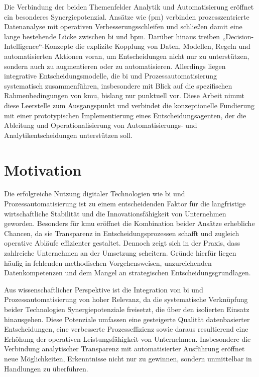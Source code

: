 Die Verbindung der beiden Themenfelder Analytik und Automatisierung eröffnet ein besonderes Synergiepotenzial. \cite{Jäger:2023} Ansätze wie  (\gls{pm}) verbinden prozesszentrierte Datenanalyse mit operativen Verbesserungsschleifen und schließen damit eine lange bestehende Lücke zwischen \gls{bi} und \gls{bpm}. \cite{vanDerAalst:2016} Darüber hinaus treiben „Decision-Intelligence“-Konzepte die explizite Kopplung von Daten, Modellen, Regeln und automatisierten Aktionen voran, um Entscheidungen nicht nur zu unterstützen, sondern auch zu augmentieren oder zu automatisieren. \cite{BrethenouxEtAl:2024} Allerdings liegen integrative Entscheidungsmodelle, die \gls{bi} und Prozessautomatisierung systematisch zusammenführen, insbesondere mit Blick auf die spezifischen Rahmenbedingungen von \gls{kmu}, bislang nur punktuell vor. \cite{NajahElGharibAmyot:2023,SamuelFossoWambaMishra:2017} Diese Arbeit nimmt diese Leerstelle zum Ausgangspunkt und verbindet die konzeptionelle Fundierung mit einer prototypischen Implementierung eines Entscheidungsagenten, der die Ableitung und Operationalisierung von Automatisierungs- und Analytikentscheidungen unterstützen soll.

\section{Motivation}\label{sec:motivation}
Die erfolgreiche Nutzung digitaler Technologien wie \gls{bi} und Prozessautomatisierung ist zu einem entscheidenden Faktor für die langfristige wirtschaftliche Stabilität und die Innovationsfähigkeit von Unternehmen geworden. \cite{OECD:2021} Besonders für \gls{kmu} eröffnet die Kombination beider Ansätze erhebliche Chancen, da sie Transparenz in Entscheidungsprozessen schafft und zugleich operative Abläufe effizienter gestaltet. \cite{OECD:2021} Dennoch zeigt sich in der Praxis, dass zahlreiche Unternehmen an der Umsetzung scheitern. \cite{Seufert:2016} Gründe hierfür liegen häufig in fehlenden methodischen Vorgehensweisen, unzureichenden Datenkompetenzen und dem Mangel an strategischen Entscheidungsgrundlagen. \cite{Seufert:2016}

Aus wissenschaftlicher Perspektive ist die Integration von \gls{bi} und Prozessautomatisierung von hoher Relevanz, da die systematische Verknüpfung beider Technologien Synergiepotenziale freisetzt, die über den isolierten Einsatz hinausgehen. \cite{Jäger:2023,vanDerAalst:2016} Diese Potenziale umfassen eine gesteigerte Qualität datenbasierter Entscheidungen, eine verbesserte Prozesseffizienz sowie daraus resultierend eine Erhöhung der operativen Leistungsfähigkeit von Unternehmen. \cite{Kieninger:2017} Insbesondere die Verbindung analytischer Transparenz mit automatisierter Ausführung eröffnet neue Möglichkeiten, Erkenntnisse nicht nur zu gewinnen, sondern unmittelbar in Handlungen zu überführen. \cite{Kieninger:2017}

